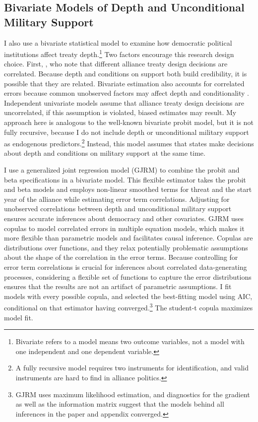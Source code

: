 \documentclass[12pt]{article}
\begin{document}
\subsection{Bivariate Models of Depth and Unconditional Military Support}


I also use a bivariate statistical model to examine how democratic political institutions affect treaty depth.\footnote{Bivariate refers to a model means two outcome variables, not a model with one independent and one dependent variable.} 
Two factors encourage this research design choice. 
First, \citet{FjelstulReiter2019}, who note that different alliance treaty design decisions are correlated.
Because depth and conditions on support both build credibility, it is possible that they are related. 
Bivariate estimation also accounts for correlated errors because common unobserved factors may affect depth and conditionality \citep{Braumoelleretal2018}.
Independent univariate models assume that alliance treaty design decisions are uncorrelated, if this assumption is violated, biased estimates may result. 
My approach here is analogous to the well-known bivariate probit model, but it is not fully recursive, because I do not include depth or unconditional military support as endogenous predictors.\footnote{A fully recursive model requires two instruments for identification, and valid instruments are hard to find in alliance politics.}  
Instead, this model assumes that states make decisions about depth and conditions on military support at the same time. 


I use a generalized joint regression model (GJRM) \citep{Braumoelleretal2018} to combine the probit and beta specifications in a bivariate model.
This flexible estimator takes the probit and beta models and employs non-linear smoothed terms for threat and the start year of the alliance while estimating error term correlations. 
Adjusting for unobserved correlations between depth and unconditional military support ensures accurate inferences about democracy and other covariates.
GJRM uses copulas to model correlated errors in multiple equation models, which makes it more flexible than parametric models and facilitates causal inference. 
Copulas are distributions over functions, and they relax potentially problematic assumptions about the shape of the correlation in the error terms. 
Because controlling for error term correlations is crucial for inferences about correlated data-generating processes, considering a flexible set of functions to capture the error distributions ensures that the results are not an artifact of parametric assumptions. 
I fit models with every possible copula, and selected the best-fitting model using AIC, conditional on that estimator having converged.\footnote{GJRM uses maximum likelihood estimation, and diagnostics for the gradient as well as the information matrix suggest that the models behind all inferences in the paper and appendix converged.} 
The student-t copula maximizes model fit. 
\end{document}
